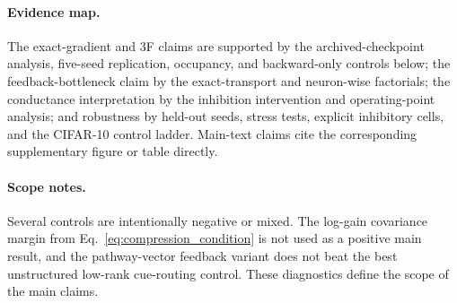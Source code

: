     \paragraph{Evidence map.}
    The exact-gradient and 3F claims are supported by the archived-checkpoint analysis, five-seed replication, occupancy, and backward-only controls below; the feedback-bottleneck claim by the exact-transport and neuron-wise factorials; the conductance interpretation by the inhibition intervention and operating-point analysis; and robustness by held-out seeds, stress tests, explicit inhibitory cells, and the CIFAR-10 control ladder. Main-text claims cite the corresponding supplementary figure or table directly.
    
    \paragraph{Scope notes.}
    Several controls are intentionally negative or mixed. The log-gain covariance margin from Eq.~\eqref{eq:compression_condition} is not used as a positive main result, and the pathway-vector feedback variant does not beat the best unstructured low-rank cue-routing control. These diagnostics define the scope of the main claims.

